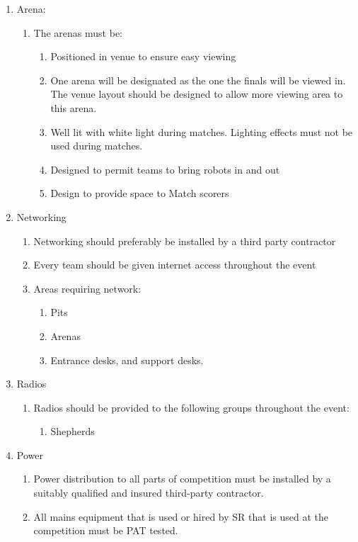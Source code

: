 \begin{enumerate}
\begin{enumerate}
  \item Arena:
    \begin{enumerate}
    \item The arenas must be:
      \begin{enumerate}
      \item Positioned in venue to ensure easy viewing
      \item One arena will be designated as the one the finals will be viewed in.  The venue layout should be designed to allow more viewing area to this arena.

      \item Well lit with white light during matches.  Lighting effects must not be used during matches.
      \item Designed to permit teams to bring robots in and out
      \item Design to provide space to Match scorers
      \end{enumerate}
    \end{enumerate}

  \item Networking
    \begin{enumerate}
    \item Networking should preferably be installed by a third party contractor
    \item Every team should be given internet access throughout the event
    \item Areas requiring network:
      \begin{enumerate}
      \item Pits
      \item Arenas
      \item Entrance desks, and support desks.
      \end{enumerate}
    \end{enumerate}

  \item Radios
    \begin{enumerate}
    \item Radios should be provided to the following groups throughout the event:
      \begin{enumerate}
      \item Shepherds
      \end{enumerate}
    \end{enumerate}

  \item Power
    \begin{enumerate}
    \item Power distribution to all parts of competition must be installed by a suitably qualified and insured third-party contractor.
      \item All mains equipment that is used or hired by SR that is used at the competition must be PAT tested.
    \end{enumerate}


\end{enumerate}
\end{enumerate}
